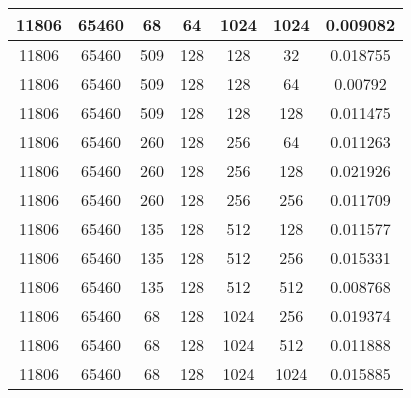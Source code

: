 \documentclass[9pt]{article}
\begin{document}
\begin{tabular}{|c|c|c|c|c|c|c| }
\hline
11806  & 65460  & 68  & 64  & 1024  & 1024  & 0.009082 \\
\hline
11806  & 65460  & 509  & 128  & 128  & 32  & 0.018755 \\
\hline
11806  & 65460  & 509  & 128  & 128  & 64  & 0.00792 \\
\hline
11806  & 65460  & 509  & 128  & 128  & 128  & 0.011475 \\
\hline
11806  & 65460  & 260  & 128  & 256  & 64  & 0.011263 \\
\hline
11806  & 65460  & 260  & 128  & 256  & 128  & 0.021926 \\
\hline
11806  & 65460  & 260  & 128  & 256  & 256  & 0.011709 \\
\hline
11806  & 65460  & 135  & 128  & 512  & 128  & 0.011577 \\
\hline
11806  & 65460  & 135  & 128  & 512  & 256  & 0.015331 \\
\hline
11806  & 65460  & 135  & 128  & 512  & 512  & 0.008768 \\
\hline
11806  & 65460  & 68  & 128  & 1024  & 256  & 0.019374 \\
\hline
11806  & 65460  & 68  & 128  & 1024  & 512  & 0.011888 \\
\hline
11806  & 65460  & 68  & 128  & 1024  & 1024  & 0.015885 \\
\hline
\end{tabular}
 
\end{document}
